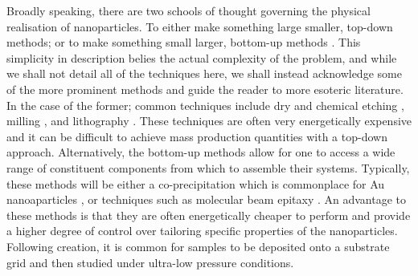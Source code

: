 Broadly speaking, there are two schools of thought governing the physical realisation of nanoparticles. To either make something large smaller, top-down methods; or to make something small larger, bottom-up methods \cite{Fra_Review}. This simplicity in description belies the actual complexity of the problem, and while we shall not detail all of the techniques here, we shall instead acknowledge some of the more prominent methods and guide the reader to more esoteric literature. In the case of the former; common techniques include dry and chemical etching \cite{Etching}, milling \cite{AuMilling}, and lithography \cite{AuLithography}. These techniques are often very energetically expensive and it can be difficult to achieve mass production quantities with a top-down approach. Alternatively, the bottom-up methods allow for one to access a wide range of constituent components from which to assemble their systems. Typically, these methods will be either a co-precipitation which is commonplace for Au nanoaparticles \cite{AuCoprecip}, or techniques such as molecular beam epitaxy \cite{AuEpitaxy}. An advantage to these methods is that they are often energetically cheaper to perform and provide a higher degree of control over tailoring specific properties of the nanoparticles. Following creation, it is common for samples to be deposited onto a substrate grid and then studied under ultra-low pressure conditions.

